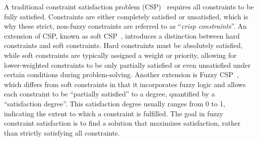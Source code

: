 A traditional constraint satisfaction problem (CSP)~\cite{brailsford1999constraint} requires all constraints to be fully
satisfied.
Constraints are either completely satisfied or unsatisfied, which is why these strict,
non-fuzzy constraints are referred to as ``\emph{crisp constraints}''.
An extension of CSP, known as soft CSP~\cite{meseguer2006soft, schiex1992possibilistic}, introduces a distinction between hard
constraints and soft constraints.
Hard constraints must be absolutely satisfied, while soft constraints are typically assigned a
weight or priority, allowing for lower-weighted constraints to be only partially satisfied or even
unsatisfied under certain conditions during problem-solving.
Another extension is Fuzzy CSP~\cite{ruttkay1994fuzzy}, which differs from soft constraints in that it
incorporates fuzzy logic and allows each constraint to be ``partially satisfied'' to a degree,
quantified by a ``satisfaction degree''.
This satisfaction degree usually ranges from 0 to 1, indicating the extent to which a constraint is
fulfilled.
The goal in fuzzy constraint satisfaction is to find a solution that maximizes satisfaction, rather
than strictly satisfying all constraints.
